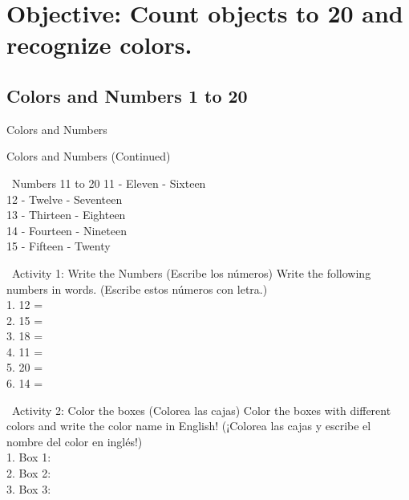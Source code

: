 \section*{Objective: Count objects to 20 and recognize colors.}

\subsection*{Colors and Numbers 1 to 20}

\begin{vocabcard}{Colors and Numbers}
\end{vocabcard}

\newpage

\begin{vocabcard}{Colors and Numbers (Continued)}
\end{vocabcard}

\begin{grammartip}{ \ Numbers 11 to 20}
  11 - Eleven  - Sixteen\\
  12 - Twelve  - Seventeen\\
  13 - Thirteen  - Eighteen\\
  14 - Fourteen  - Nineteen\\
  15 - Fifteen  - Twenty
\end{grammartip}

\begin{activity}{ \ Activity 1: Write the Numbers (Escribe los números)}
  Write the following numbers in words. (Escribe estos números con letra.)\\[1em]
  1. 12 = \answerline[4cm]\\
  2. 15 = \answerline[4cm]\\
  3. 18 = \answerline[4cm]\\
  4. 11 = \answerline[4cm]\\
  5. 20 = \answerline[4cm]\\
  6. 14 = \answerline[4cm]
\end{activity}

\begin{activity}{ \ Activity 2: Color the boxes (Colorea las cajas)}
  Color the boxes with different colors and write the color name in English! (¡Colorea las cajas y escribe el nombre del color en inglés!)\\[1em]
  1. Box 1: \answerline[4cm]\\
  2. Box 2: \answerline[4cm]\\
  3. Box 3: \answerline[4cm]\\
  \vspace{2cm}
\end{activity}

